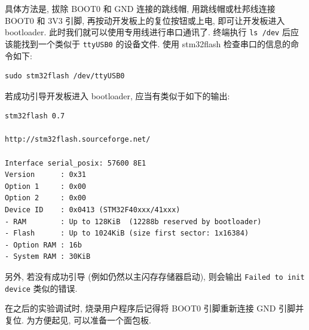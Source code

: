 具体方法是, 拔除 BOOT0 和 GND 连接的跳线帽, 用跳线帽或杜邦线连接 BOOT0 和 3V3 引脚, 再按动开发板上的复位按钮或上电, 即可让开发板进入 bootloader. 此时我们就可以使用专用线进行串口通讯了. 终端执行 \texttt{ls /dev} 后应该能找到一个类似于 \texttt{ttyUSB0} 的设备文件. 使用 stm32flash 检查串口的信息的命令如下:

\begin{verbatim}
sudo stm32flash /dev/ttyUSB0
\end{verbatim}

若成功引导开发板进入 bootloader, 应当有类似于如下的输出:

\begin{verbatim}
stm32flash 0.7

http://stm32flash.sourceforge.net/

Interface serial_posix: 57600 8E1
Version      : 0x31
Option 1     : 0x00
Option 2     : 0x00
Device ID    : 0x0413 (STM32F40xxx/41xxx)
- RAM        : Up to 128KiB  (12288b reserved by bootloader)
- Flash      : Up to 1024KiB (size first sector: 1x16384)
- Option RAM : 16b
- System RAM : 30KiB
\end{verbatim}

另外, 若没有成功引导 (例如仍然以主闪存存储器启动), 则会输出 \texttt{Failed to init device} 类似的错误.

在之后的实验调试时, 烧录用户程序后记得将 BOOT0 引脚重新连接 GND 引脚并复位. 为方便起见, 可以准备一个面包板.

